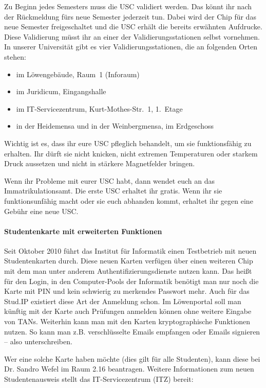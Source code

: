 Zu Beginn jedes Semesters muss die USC validiert werden. Das könnt ihr nach der Rückmeldung fürs neue Semester jederzeit tun.
Dabei wird der Chip für das neue Semester freigeschaltet und die USC erhält die bereits erwähnten Aufdrucke.
Diese Validierung müsst ihr an einer der Validierungsstationen selbst vornehmen.
In unserer Universität gibt es vier Validierungsstationen, die an folgenden Orten stehen:

\begin{itemize}
    \item im Löwengebäude, Raum~1 (Inforaum)
    \item im Juridicum, Eingangshalle
    \item im IT-Servicezentrum, Kurt-Mothes-Str.~1, 1.~Etage
    \item in der Heidemensa und in der Weinbergmensa, im Erdgeschoss
\end{itemize}

Wichtig ist es, dass ihr eure USC pfleglich behandelt, um sie funktionsfähig zu erhalten.
Ihr dürft sie nicht knicken, nicht extremen Temperaturen oder starkem Druck aussetzen und nicht in stärkere Magnetfelder bringen.

Wenn ihr Probleme mit eurer USC habt, dann wendet euch an das Immatrikulationsamt.
Die erste USC erhaltet ihr gratis.
Wenn ihr sie funktionsunfähig macht oder sie euch abhanden kommt, erhaltet ihr gegen eine Gebühr eine neue USC.

\paragraph{Studentenkarte mit erweiterten Funktionen}

Seit Oktober 2010 führt das Institut für Informatik einen Testbetrieb mit neuen Studentenkarten durch.
Diese neuen Karten verfügen über einen weiteren Chip mit dem man unter anderem Authentifizierungsdienste nutzen kann.
Das heißt für den Login, in den Computer-Pools der Informatik benötigt man nur noch die Karte mit PIN und kein schwierig zu merkendes Passwort mehr.
Auch für das Stud.IP existiert diese Art der Anmeldung schon.
Im Löwenportal soll man künftig mit der Karte auch Prüfungen anmelden können ohne weitere Eingabe von TANs.
Weiterhin kann man mit den Karten kryptographische Funktionen nutzen.
So kann man z.B. verschlüsselte Emails empfangen oder Emails signieren -- also unterschreiben.

Wer eine solche Karte haben möchte (dies gilt für alle Studenten), kann diese bei Dr. Sandro Wefel im Raum 2.16 beantragen.
Weitere Informationen zum neuen Studentenausweis stellt das IT-Servicezentrum (ITZ) bereit:\\[1.0em]


